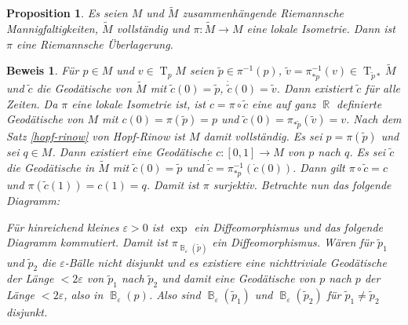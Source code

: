 \documentclass[paper=A4, twoside, chapterprefix=true, bibliography=totoc, headsepline]{scrbook}
\let\temp\phi{}
\let\phi\varphi{}
\let\varphi\temp{}
\let\temp\theta{}
\let\theta\vartheta{}
\let\vartheta\temp{}
\let\temp\epsilon{}
\let\epsilon\varepsilon{}
\let\varepsilon\temp{}
\let\temp\rho{}
\let\rho\varrho{}
\let\varrho\temp{}
\DeclareMathOperator{\R}{\mathbb{R}}
\DeclareMathOperator{\B}{\mathbb{B}} %
\DeclareMathOperator{\T}{T}         %
\theoremstyle{plain}
\newtheorem{Prop}[Dfn]{Proposition}
\theoremstyle{nonumberplain}
\newtheorem{bew}{Beweis}
\theoremstyle{empty}
\theoremstyle{break}
\begin{document}
\begin{Prop}\label{prop-9-12}
  Es seien $M$ und $\tilde M$ zusammenh\"angende Riemannsche Mannigfaltigkeiten, $\tilde M$ vollst\"andig und $\pi: \tilde M \to M$ eine lokale Isometrie. Dann ist $\pi$ eine Riemannsche \"Uberlagerung.
\end{Prop}

\begin{bew}
  F\"ur $p \in M$ und $v \in \T_pM$ seien $\tilde p \in \pi^{-1}(p)$, $\tilde v = \pi_{*p}^{-1}(v) \in \T_{\tilde p *}\tilde M$ und $\tilde c$ die Geod\"atische von $\tilde M$ mit $\tilde c(0) = \tilde p$, $\dot{\tilde{c}}(0) = \tilde v$.
  Dann existiert $\tilde c$ f\"ur alle Zeiten. Da $\pi$ eine lokale Isometrie ist, ist $c = \pi \circ \tilde c$ eine auf ganz $\R$ definierte Geod\"atische von $M$ mit $c(0) = \pi(\tilde p) = p$ und $\tilde c(0) = \pi_{* \tilde p}(\tilde v) = v$.
  Nach dem Satz \ref{hopf-rinow} von Hopf-Rinow ist $M$ damit vollst\"andig. Es sei $p = \pi(\tilde p)$ und sei $q \in M$.
  Dann existiert eine Geod\"atische $c: [0,1] \to M$ von $p$ nach $q$. Es sei $\tilde c$ die Geod\"atische in $\tilde M$ mit $\tilde c(0) = \tilde p$ und $\dot{\tilde{c}} = \pi_{*p}^{-1}(\dot c(0))$.
  Dann gilt $\pi \circ \tilde c = c$ und $\pi(\tilde c(1)) = c(1) = q$.
  Damit ist $\pi$ surjektiv. Betrachte nun das folgende Diagramm:
  \begin{center}\end{center}
  F\"ur hinreichend kleines $\epsilon > 0$ ist $\exp$ ein Diffeomorphismus und das folgende Diagramm kommutiert.
  Damit ist $\pi_{\B_\epsilon(\tilde p)}$ ein Diffeomorphismus.
  W\"aren f\"ur $\tilde p_1$ und $\tilde p_2$ die $\epsilon$-B\"alle nicht disjunkt und es existiere eine nichttriviale Geod\"atische der L\"ange $< 2 \epsilon$ von $\tilde p_1$ nach $\tilde p_2$ und damit eine Geod\"atische von $p$ nach $p$ der L\"ange $< 2 \epsilon$, also in $\B_\epsilon(p)$.
  Also sind $\B_\epsilon(\tilde p_1)$ und $\B_\epsilon(\tilde p_2)$ f\"ur $\tilde p_1 \ne \tilde p_2$ disjunkt.
\end{bew}
\end{document}

